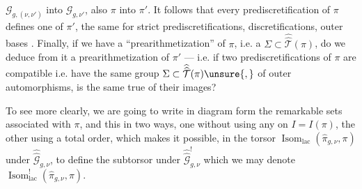 
 $\mathcal G_{g,(\nu,\nu')}$ into $\mathcal G_{g,\nu'}$, also $\pi$ into $\pi'$. It follows that every prediscretification of $\pi$ defines one of $\pi'$, the same for strict prediscretifications,  discretifications, outer bases . Finally, if we have a ``prearithmetization'' of $\pi$, i.e. a $\Sigma\subset\widehat{\widehat{\mathcal T}}(\pi)$, do we deduce from it a prearithmetization of $\pi'$ --- i.e.  if two prediscretifications of $\pi$ are compatible i.e.  have the same group $\Sigma\subset\widehat{\widehat{\mathcal T}}(\pi)\unsure{,}$ of outer automorphisms, is the same true of their images?


To see more clearly, we are going to write in diagram form the remarkable sets associated with $\pi$, and this in two ways, one without using any  on $I=I(\pi)$, the other using a total order, which makes it possible, in the torsor $\operatorname{Isom}_{\mathrm{lac}}(\widehat\pi_{g,\nu},\pi)$ under $\widehat{\widehat{\mathcal G}}_{g,\nu}$, to define the subtorsor under $\widehat{\widehat{\mathcal G}}_{g,\nu}^{!}$ which we may denote  $\operatorname{Isom}_{\mathrm{lac}}^{!}(\widehat\pi_{g,\nu},\pi)$.


